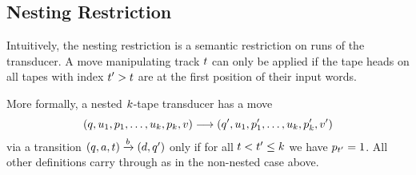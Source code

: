 \subsection{Nesting Restriction}

Intuitively, the nesting restriction is a semantic restriction on runs of the transducer.
A move manipulating track $t$ can only be applied if the tape heads on all tapes with index $t' > t$ are at the first position of their input words.

More formally, a nested $k$-tape transducer has a move
\[
    \left(
        q,
        u_1, p_1,
        \ldots,
        u_k, p_k,
        v
    \right)
    \longrightarrow
    \left(
        q',
        u_1, p'_1,
        \ldots,
        u_k, p'_k,
        v'
    \right)
\]
via a transition
$\left(q,a,t\right) \xrightarrow{b} \left(d,q'\right)$
only if for all
$t < t' \leq k$
we have
$p_{t'} = 1$.
All other definitions carry through as in the non-nested case above.

